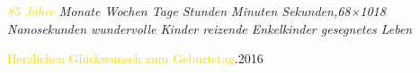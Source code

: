  \begin{center}
  \Huge{\emph{\textcolor{gold}{85 Jahre}\newline{} Monate Wochen Tage Stunden Minuten Sekunden,68×1018   Nanosekunden\newline{} wundervolle Kinder reizende Enkelkinder\newline{} gesegnetes Leben\newline\newline}}
\end{center}
\begin{center}
\Huge{\textcolor{gold}{Herzlichen Glückwunsch zum Geburtstag}\newline{}.2016}
\end{center}